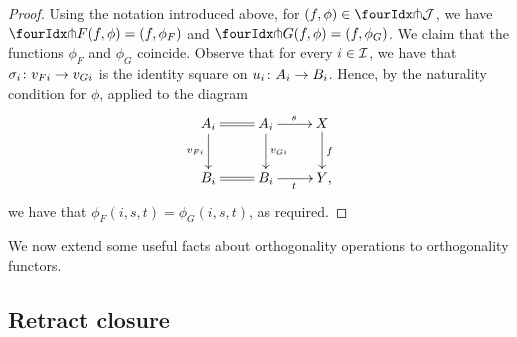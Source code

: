 \documentclass[reqno,10pt,a4paper,oneside,draft]{amsart}
\begin{document}
\begin{proof} Using the notation introduced above, for $(f, \phi) \in \liftr{\cal{J}}$, we have $\liftr{F}(f, \phi) = (f, \phi_F)$ and $\liftr{G}(f, \phi) = (f, \phi_G)$.
We claim that the functions $\phi_F$ and $\phi_G$ coincide.
Observe that for every $i \in \cal{I}$, we have that $\sigma_i \co v_{Fi} \to v_{Gi}$ is the identity square on $u_i \co A_i \to B_i$.
Hence, by the naturality condition for $\phi$, applied to the diagram
\[
\xymatrix{
  A_i
  \ar@{=}[r]
  \ar[d]_{v_{Fi}}
&
  A_i
  \ar[d]^{v_{Gi}}
  \ar[r]^{s}
&
  X
  \ar[d]^{f}
\\
  B_i
  \ar@{=}[r]
&
  B_i
  \ar[r]_{t}
&
  Y
\rlap{,}}
\]
we have that $\phi_F(i, s, t) = \phi_G(i, s, t)$, as required.
\end{proof}

We now extend some useful facts about orthogonality operations to orthogonality functors.

\subsection*{Retract closure}
\end{document}
